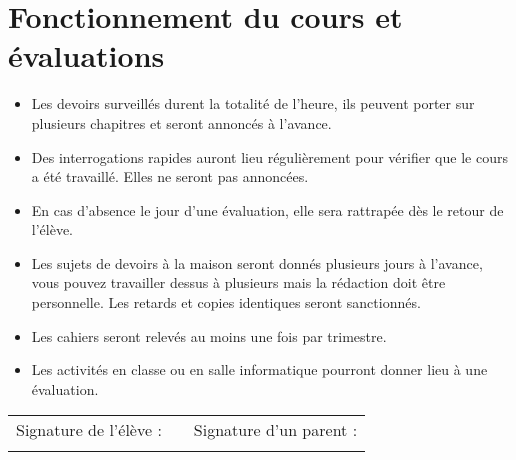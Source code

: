 \documentclass[a4paper, 11pt]{article}
\begin{document}
\section{Fonctionnement du cours et évaluations}

\begin{itemize}
	\item Les devoirs surveillés durent la totalité de l'heure, ils peuvent porter sur plusieurs chapitres et seront annoncés à l'avance.
	
	\item Des interrogations rapides auront lieu régulièrement pour vérifier que le cours a été travaillé. Elles ne seront pas annoncées.
	
	\item En cas d'absence le jour d'une évaluation, elle sera rattrapée dès le retour de l'élève.
	
	\item Les sujets de devoirs à la maison seront donnés plusieurs jours à l'avance, vous pouvez travailler dessus à plusieurs mais la rédaction doit être personnelle. Les retards et copies identiques seront sanctionnés.
	
	\item Les cahiers seront relevés au moins une fois par trimestre.
	
	\item Les activités en classe ou en salle informatique pourront donner lieu à une évaluation.
	
	
	
\end{itemize}

\vspace*{0.5cm}
\begin{tabular}{ccr}
	
	Signature de l'élève : & \hspace*{5cm} & Signature d'un parent : \\
	&  &                      
\end{tabular}
	
\end{document}

